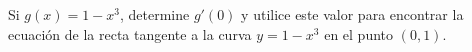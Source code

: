 \item Si $g(x) = 1 - x^3$, determine $g'(0)$ y utilice este valor para encontrar la ecuación de la recta tangente a la curva $y = 1 - x^3$ en el punto $(0,1)$.
